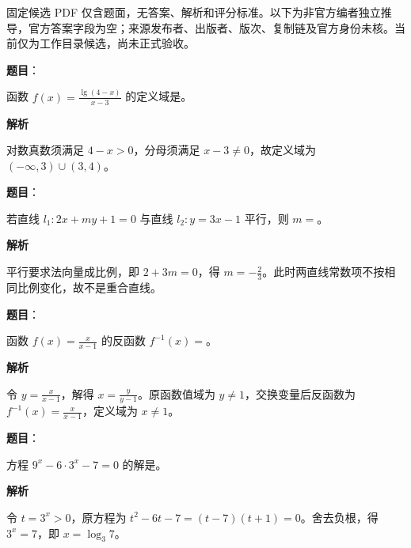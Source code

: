 

\begin{gktip}
固定候选 PDF 仅含题面，无答案、解析和评分标准。以下为非官方编者独立推导，官方答案字段为空；来源发布者、出版者、版次、复制链及官方身份未核。当前仅为工作目录候选，尚未正式验收。
\end{gktip}

\begin{answer}

\textbf{题目}：

函数 $f(x)=\frac{\lg(4-x)}{x-3}$ 的定义域是\gkblank{}。

\textbf{解析}

对数真数须满足 $4-x>0$，分母须满足 $x-3\ne0$，故定义域为 $(-\infty,3)\cup(3,4)$。


\end{answer}
\begin{answer}

\textbf{题目}：

若直线 $l_1:2x+my+1=0$ 与直线 $l_2:y=3x-1$ 平行，则 $m=$\gkblank{}。

\textbf{解析}

平行要求法向量成比例，即 $2+3m=0$，得 $m=-\frac23$。此时两直线常数项不按相同比例变化，故不是重合直线。


\end{answer}
\begin{answer}

\textbf{题目}：

函数 $f(x)=\frac{x}{x-1}$ 的反函数 $f^{-1}(x)=$\gkblank{}。

\textbf{解析}

令 $y=\frac{x}{x-1}$，解得 $x=\frac{y}{y-1}$。原函数值域为 $y\ne1$，交换变量后反函数为 $f^{-1}(x)=\frac{x}{x-1}$，定义域为 $x\ne1$。


\end{answer}
\begin{answer}

\textbf{题目}：

方程 $9^x-6\cdot3^x-7=0$ 的解是\gkblank{}。

\textbf{解析}

令 $t=3^x>0$，原方程为 $t^2-6t-7=(t-7)(t+1)=0$。舍去负根，得 $3^x=7$，即 $x=\log_3 7$。


\end{answer}
